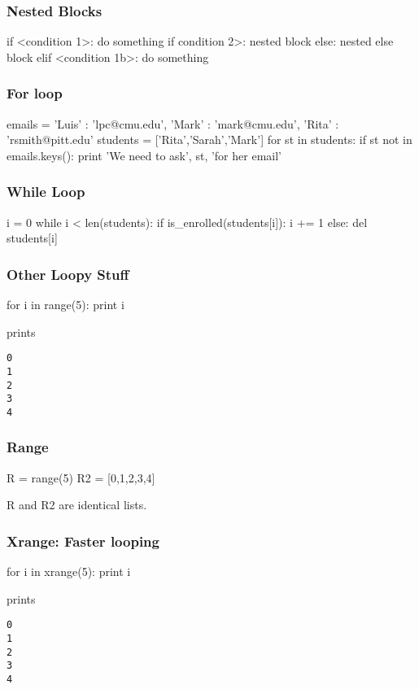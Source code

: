 \begin{frame}[fragile]
\frametitle{Nested Blocks}

\begin{python}
if <condition 1>:
    do something
    if condition 2>:
        nested block
    else:
        nested else block
elif <condition 1b>:
    do something
\end{python}
\end{frame}

\begin{frame}[fragile]
\frametitle{For loop}

\begin{python}
emails = { 'Luis' : 'lpc@cmu.edu',
           'Mark' : 'mark@cmu.edu',
           'Rita' : 'rsmith@pitt.edu' }
students = ['Rita','Sarah','Mark']
for st in students:
    if st not in emails.keys():
        print 'We need to ask', st, 'for her email'
\end{python}
\end{frame}

\begin{frame}[fragile]
\frametitle{While Loop}

\begin{python}
i = 0
while i < len(students):
    if is_enrolled(students[i]):
        i += 1
    else:
        del students[i]
\end{python}
\end{frame}

\begin{frame}[fragile]
\frametitle{Other Loopy Stuff}

\begin{python}
for i in range(5):
    print i
\end{python}

prints

\begin{verbatim}
0
1
2
3
4
\end{verbatim}
\end{frame}

\begin{frame}[fragile]
\frametitle{Range}
\begin{python}
R = range(5)
R2 = [0,1,2,3,4]
\end{python}

R and R2 are identical lists.
\end{frame}

\begin{frame}[fragile]
\frametitle{Xrange: Faster looping}
\begin{python}
for i in xrange(5):
    print i
\end{python}

prints

\begin{verbatim}
0
1
2
3
4
\end{verbatim}
\end{frame}

